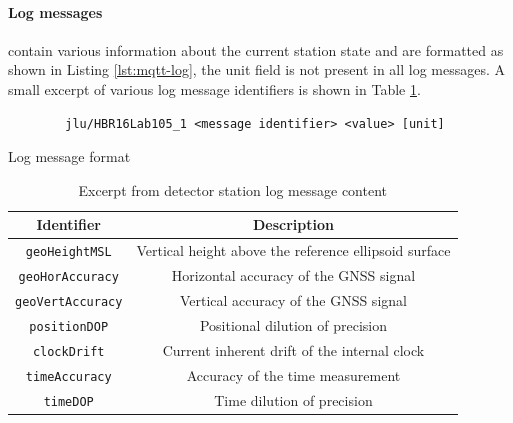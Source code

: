 \documentclass[abstract,toc,los,lof,english,10pt,glossary,acronyms]{jluthesis}
\begin{document}
\paragraph{Log messages} contain various information about the current station state and are formatted as shown in Listing \ref{lst:mqtt-log}, the unit field is not present in all log messages. A small excerpt of various log message identifiers is shown in Table \ref{tab:station_logs}.
\begin{lstfloat}[H]
	\centering
	\begin{verbatim}
		jlu/HBR16Lab105_1 <message identifier> <value> [unit]
	\end{verbatim}
	\caption{Log message format}
	\label{lst:mqtt-log}
\end{lstfloat}
\begin{table}[H]
	\centering
	\begin{tabular}{| c | c |}
		\hline
		\textbf{Identifier} & \textbf{Description} \\
		\hline
		\verb*|geoHeightMSL| & Vertical height above the reference ellipsoid surface \\
		\hline
		\verb*|geoHorAccuracy| & Horizontal accuracy of the GNSS signal \\
		\hline
		\verb*|geoVertAccuracy| & Vertical accuracy of the GNSS signal \\
		\hline
		\verb*|positionDOP| & Positional dilution of precision\footnotemark \\
		\hline
		\verb*|clockDrift| & Current inherent drift of the internal clock\\
		\hline
		\verb*|timeAccuracy| & Accuracy of the time measurement \\
		\hline
		\verb*|timeDOP| & Time dilution of precision \\
		\hline
	\end{tabular}
	\caption{Excerpt from detector station log message content}
	\label{tab:station_logs}
\end{table}
\end{document}
